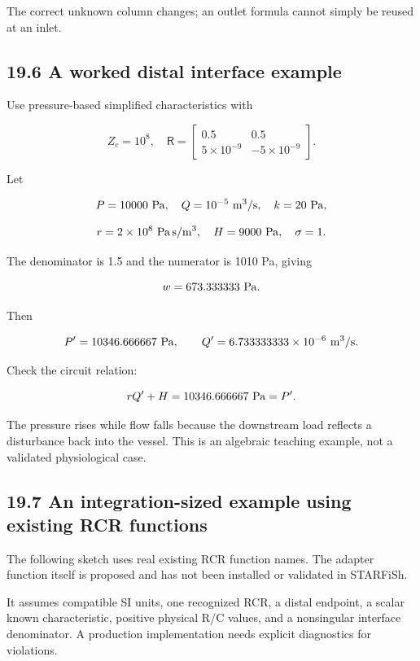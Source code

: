 \documentclass[11pt,a4paper]{article}
\begin{document}
The correct unknown column changes; an outlet formula cannot simply be reused at an inlet.

\subsection{19.6 A worked distal interface example}
Use pressure-based simplified characteristics with


\begingroup\small
\[
Z_c=10^8,\quad
\mathsf R=
\begin{bmatrix}
0.5&0.5\\
5\times10^{-9}&-5\times10^{-9}
\end{bmatrix}.
\]
\endgroup


Let


\begingroup\small
\[
P=10000\ {\rm Pa},\quad
Q=10^{-5}\ {\rm m^3/s},\quad
k=20\ {\rm Pa},
\]
\endgroup



\begingroup\small
\[
r=2\times10^8\ {\rm Pa\,s/m^3},
\quad H=9000\ {\rm Pa},\quad \sigma=1.
\]
\endgroup


The denominator is 1.5 and the numerator is 1010 Pa, giving


\begingroup\small
\[
w=673.333333\ {\rm Pa}.
\]
\endgroup


Then


\begingroup\small
\[
P'=10346.666667\ {\rm Pa},
\qquad
Q'=6.733333333\times10^{-6}\ {\rm m^3/s}.
\]
\endgroup


Check the circuit relation:


\begingroup\small
\[
rQ'+H=10346.666667\ {\rm Pa}=P'.
\]
\endgroup


The pressure rises while flow falls because the downstream load reflects a disturbance back into the vessel. This is an algebraic teaching example, not a validated physiological case.

\subsection{19.7 An integration-sized example using existing RCR functions}
The following sketch uses real existing RCR function names. The adapter function itself is proposed and has not been installed or validated in STARFiSh.

It assumes compatible SI units, one recognized RCR, a distal endpoint, a scalar known characteristic, positive physical R/C values, and a nonsingular interface denominator. A production implementation needs explicit diagnostics for violations.
\end{document}

